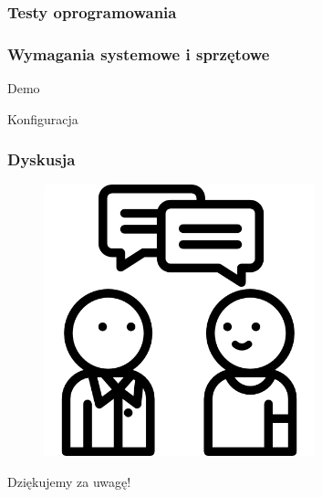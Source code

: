 \documentclass[aspectratio=169]{beamer}
\begin{document}
\begin{frame}
	\frametitle{Testy oprogramowania} %
\end{frame}


\begin{frame}
	\frametitle{Wymagania systemowe i sprzętowe}
\end{frame}

\begin{frame}
	  \begin{center}
	\Huge Demo
	\end{center}
\end{frame}

\begin{frame}
	  \begin{center}
	\Huge Konfiguracja
	\end{center}
\end{frame}




\begin{frame}
	\frametitle{Dyskusja}
	\begin{figure}
		\centering
		\includegraphics[width=0.7\textwidth]{questions.png}
	\end{figure}
\end{frame}


\begin{frame}
	  \begin{center}
	\Huge Dziękujemy za uwagę!
	\end{center}
\end{frame}
\end{document}
